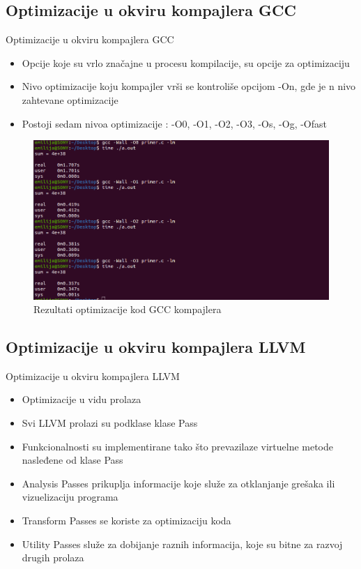 \documentclass[compress, containsverbatim,mathserif, xcolor=dvipsnames, unicode]{beamer}
\begin{document}
\subsection{Optimizacije u okviru kompajlera GCC}
\begin{frame}{Optimizacije u okviru kompajlera GCC}
    \begin{itemize}
        \item Opcije koje su vrlo značajne u procesu kompilacije, su opcije za optimizaciju
        \item Nivo optimizacije koju kompajler vrši se kontroliše
opcijom -On, gde je n nivo zahtevane optimizacije
        \item Postoji sedam nivoa optimizacije : -O0, -O1, -O2, -O3, -Os, -Og, -Ofast
    \end{itemize}
     \begin{figure}[h!]
        \begin{center}
       \includegraphics[scale = 0.3]{../pics/test.png}
       \end{center}
       \caption{Rezultati optimizacije kod GCC kompajlera}
    \end{figure}    
\end{frame}

\subsection{Optimizacije u okviru kompajlera LLVM}
\begin{frame}{Optimizacije u okviru kompajlera LLVM}
    \begin{itemize}
        \item Optimizacije u vidu prolaza
        \item Svi LLVM prolazi su podklase klase Pass
        \item Funkcionalnosti su implementirane tako što prevazilaze virtuelne metode nasleđene od klase Pass
        \item Analysis Passes prikuplja informacije koje 
služe za otklanjanje grešaka ili vizuelizaciju programa
        \item Transform Passes se koriste za optimizaciju koda
        \item Utility Passes služe za dobijanje raznih
informacija, koje su bitne za razvoj drugih prolaza
    \end{itemize}    
\end{frame}
\end{document}
